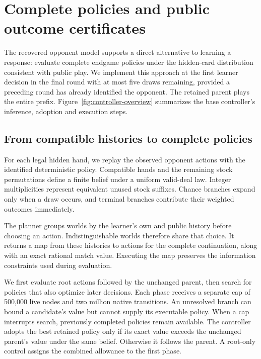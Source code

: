 \section{Complete policies and public outcome certificates}
\label{sec:incumbent-tail}
The recovered opponent model supports a direct alternative to learning a
response: evaluate complete endgame policies under the hidden-card distribution
consistent with public play. We implement this approach at the first learner
decision in the final round with at most five draws remaining, provided a
preceding round has already identified the opponent. The retained parent plays
the entire prefix. Figure~\ref{fig:controller-overview} summarizes the
base controller's inference, adoption and execution steps.



\subsection{From compatible histories to complete policies}
For each legal hidden hand, we replay the observed opponent actions with the
identified deterministic policy. Compatible hands and the remaining stock
permutations define a finite belief under a uniform valid-deal law. Integer
multiplicities represent equivalent unused stock suffixes. Chance branches
expand only when a draw occurs, and terminal branches contribute their weighted
outcomes immediately.

The planner groups worlds by the learner's own and public history before
choosing an action. Indistinguishable worlds therefore share that choice.
It returns a map from these histories to actions for the complete continuation,
along with an exact rational match value. Executing the map preserves the
information constraints used during evaluation.

We first evaluate root actions followed by the unchanged parent, then search
for policies that also optimize later decisions. Each phase receives a separate
cap of 500,000 live nodes and two million native transitions. An unresolved
branch can bound a candidate's value but cannot supply its executable policy.
When a cap interrupts search, previously completed policies remain available.
The controller adopts the best retained policy only if its exact value exceeds
the unchanged parent's value under the same belief. Otherwise it follows the
parent. A root-only control assigns the combined allowance to the first phase.

